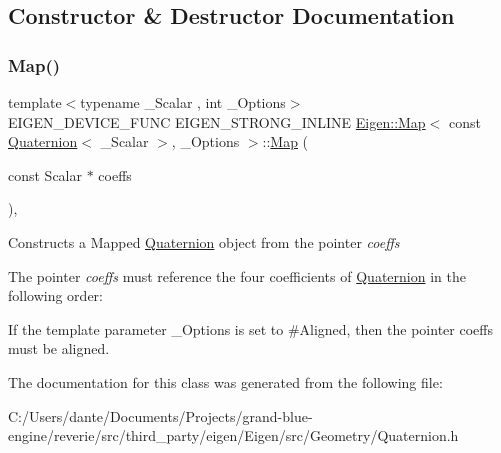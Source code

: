 \subsection{Constructor \& Destructor Documentation}
\mbox{\label{class_eigen_1_1_map_3_01const_01_quaternion_3_01___scalar_01_4_00_01___options_01_4_a8b321eb2bf9a4e4b76465564e80f212b}} 
\subsubsection{\texorpdfstring{Map()}{Map()}}
{\footnotesize\ttfamily template$<$typename \+\_\+\+Scalar , int \+\_\+\+Options$>$ \\
E\+I\+G\+E\+N\+\_\+\+D\+E\+V\+I\+C\+E\+\_\+\+F\+U\+NC E\+I\+G\+E\+N\+\_\+\+S\+T\+R\+O\+N\+G\+\_\+\+I\+N\+L\+I\+NE \mbox{\hyperlink{class_eigen_1_1_map}{Eigen\+::\+Map}}$<$ const \mbox{\hyperlink{class_eigen_1_1_quaternion}{Quaternion}}$<$ \+\_\+\+Scalar $>$, \+\_\+\+Options $>$\+::\mbox{\hyperlink{class_eigen_1_1_map}{Map}} (\begin{DoxyParamCaption}\item[{const Scalar $\ast$}]{coeffs }\end{DoxyParamCaption})\hspace{0.3cm}{\ttfamily [inline]}, {\ttfamily [explicit]}}

Constructs a Mapped \mbox{\hyperlink{class_eigen_1_1_quaternion}{Quaternion}} object from the pointer {\itshape coeffs} 

The pointer {\itshape coeffs} must reference the four coefficients of \mbox{\hyperlink{class_eigen_1_1_quaternion}{Quaternion}} in the following order\+: 
\begin{DoxyCode}{0}
\end{DoxyCode}


If the template parameter \+\_\+\+Options is set to \#\+Aligned, then the pointer coeffs must be aligned. 

The documentation for this class was generated from the following file\+:\begin{DoxyCompactItemize}
\item 
C\+:/\+Users/dante/\+Documents/\+Projects/grand-\/blue-\/engine/reverie/src/third\+\_\+party/eigen/\+Eigen/src/\+Geometry/Quaternion.\+h\end{DoxyCompactItemize}
